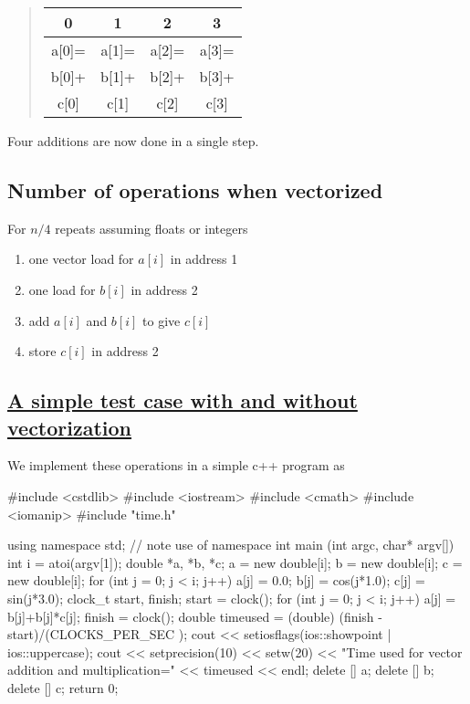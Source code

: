 \documentclass[%
oneside,                 %
final,                   %
10pt]{article}
\begin{document}
\begin{quote}
\begin{tabular}{cccc}
\hline
\multicolumn{1}{c}{ 0 } & \multicolumn{1}{c}{ 1 } & \multicolumn{1}{c}{ 2 } & \multicolumn{1}{c}{ 3 } \\
\hline
a[0]= & a[1]= & a[2]= & a[3]= \\
\hline
b[0]+ & b[1]+ & b[2]+ & b[3]+ \\
\hline
c[0]  & c[1]  & c[2]  & c[3]  \\
\hline
\end{tabular}
\end{quote}

\noindent
Four additions are now done in a single step.

\subsection{Number of operations when vectorized}
For $n/4$ repeats assuming floats or integers
\begin{enumerate}
\item one vector load for $a[i]$ in address 1

\item one load for $b[i]$ in address 2

\item add $a[i]$ and $b[i]$ to give $c[i]$

\item store $c[i]$ in address 2
\end{enumerate}

\noindent
\subsection{\href{{https://github.com/CompPhysics/ComputationalPhysicsMSU/blob/master/doc/Programs/LecturePrograms/programs/Classes/cpp/program7.cpp}}{A simple test case with and without vectorization}}
We implement these operations in a simple c++ program as 

\bcppcode
#include <cstdlib>
#include <iostream>
#include <cmath>
#include <iomanip>
#include "time.h" 

using namespace std; // note use of namespace                                       
int main (int argc, char* argv[])
{
  int i = atoi(argv[1]); 
  double *a, *b, *c;
  a = new double[i]; 
  b = new double[i]; 
  c = new double[i]; 
  for (int j = 0; j < i; j++) {
    a[j] = 0.0;
    b[j] = cos(j*1.0);
    c[j] = sin(j*3.0);
  }
  clock_t start, finish;
  start = clock();
  for (int j = 0; j < i; j++) {
    a[j] = b[j]+b[j]*c[j];
  }
  finish = clock();
  double timeused = (double) (finish - start)/(CLOCKS_PER_SEC );
  cout << setiosflags(ios::showpoint | ios::uppercase);
  cout << setprecision(10) << setw(20) << "Time used  for vector addition and multiplication=" << timeused  << endl;
  delete [] a;
  delete [] b;
  delete [] c;
  return 0;     
}
\ecppcode
\end{document}

